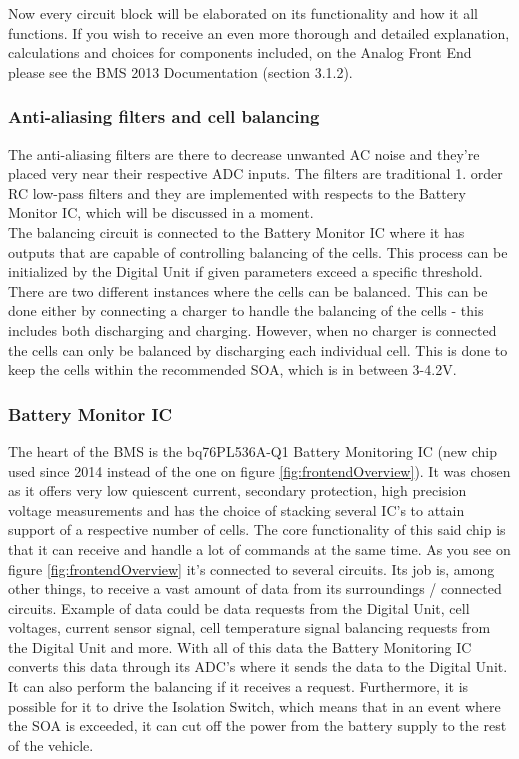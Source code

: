 Now every circuit block will be elaborated on its functionality and how it all functions. If you wish to receive an even more thorough and detailed explanation, calculations and choices for components included, on the Analog Front End please see the BMS 2013 Documentation \cite{BMSDocumentation} (section 3.1.2).

\subsubsection{Anti-aliasing filters and cell balancing}
The anti-aliasing filters are there to decrease unwanted AC noise and they're placed very near their respective ADC inputs. The filters are traditional 1. order RC low-pass filters and they are implemented with respects to the Battery Monitor IC, which will be discussed in a moment.\\
The balancing circuit is connected to the Battery Monitor IC where it has outputs that are capable of controlling balancing of the cells. This process can be initialized by the Digital Unit if given parameters exceed a specific threshold.\\
There are two different instances where the cells can be balanced. This can be done either by connecting a charger to handle the balancing of the cells - this includes both discharging and charging. However, when no charger is connected the cells can only be balanced by discharging each individual cell. This is done to keep the cells within the recommended SOA, which is in between 3-4.2V.

\subsubsection{Battery Monitor IC}
\label{sec:BatMonIC}
The heart of the BMS is the bq76PL536A-Q1\cite{BMSBattIC} Battery Monitoring IC (new chip used since 2014 instead of the one on figure \vref{fig:frontendOverview}). It was chosen as it offers very low quiescent current, secondary protection, high precision voltage measurements and has the choice of stacking several IC's to attain support of a respective number of cells. The core functionality of this said chip is that it can receive and handle a lot of commands at the same time. As you see on figure \vref{fig:frontendOverview} it's connected to several circuits. Its job is, among other things, to receive a vast amount of data from its surroundings / connected circuits. Example of data could be data requests from the Digital Unit, cell voltages, current sensor signal, cell temperature signal balancing requests from the Digital Unit and more. With all of this data the Battery Monitoring IC converts this data through its ADC's where it sends the data to the Digital Unit. It can also perform the balancing if it receives a request. Furthermore, it is possible for it to drive the Isolation Switch, which means that in an event where the SOA is exceeded, it can cut off the power from the battery supply to the rest of the vehicle.

